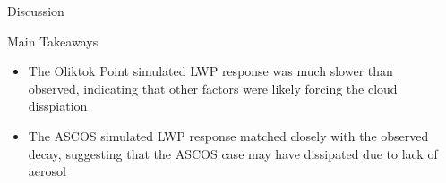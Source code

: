 \documentclass[final]{beamer}
\newlength{\sepwid}
\newlength{\onecolwid}
\begin{document}
\begin{frame}[t]
\begin{columns}[t]
\begin{column}{\onecolwid}
\begin{block}{Discussion}
	\end{block}
	\begin{alertblock}{Main Takeaways}
		\begin{itemize}
			\item The Oliktok Point simulated LWP response was much slower than observed, indicating that other factors were likely forcing the cloud disspiation	
			\item The ASCOS simulated LWP response matched closely with the observed decay, suggesting that the ASCOS case may have dissipated due to lack of aerosol
		\end{itemize}
	\end{alertblock}
\end{column}
\begin{column}{\sepwid}\end{column} %

\end{columns} %

\end{frame} %
\end{document}
